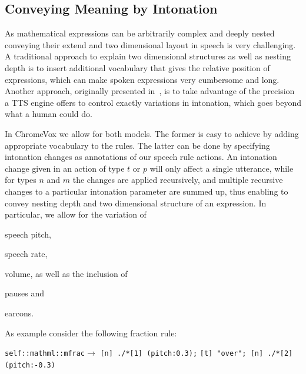 \documentclass{sig-alternate}
\begin{document}
\subsection{Conveying Meaning by Intonation}

As mathematical expressions can be arbitrarily complex and deeply nested
conveying their extend and two dimensional layout in speech is very challenging.
A traditional approach to explain two dimensional structures as well as nesting
depth is to insert additional vocabulary that gives the relative position of
expressions, which can make spoken expressions very cumbersome and long.
Another approach, originally presented in~\cite{raman1994aster}, is to take
advantage of the precision a TTS engine offers to control exactly variations in
intonation, which goes beyond what a human could do.

In ChromeVox we allow for both models. The former is easy to achieve by adding
appropriate vocabulary to the rules. The latter can be done by specifying
intonation changes as annotations of our speech rule actions. An intonation
change given in an action of type $t$ or $p$ will only affect a single
utterance, while for types $n$ and $m$ the changes are applied recursively,
and multiple recursive changes to a particular intonation parameter are summed
up, thus enabling to convey nesting depth and two dimensional structure of an
expression.  In particular, we allow for the variation of
\begin{inparaenum}[(1)]
\item speech pitch,
\item speech rate,
\item volume, as well as the inclusion of
\item pauses and
\item earcons.
\end{inparaenum}

As example consider the following fraction rule:

\noindent\texttt{self::mathml::mfrac}$\longrightarrow$
\texttt{[n] ./*[1] (pitch:0.3);}\newline
\hspace*{\fill}\texttt{[t] "over"; [n] ./*[2] (pitch:-0.3)}
\end{document}

